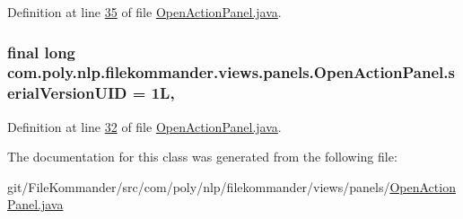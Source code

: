 Definition at line \hyperlink{L35}{35} of file \hyperlink{}{Open\-Action\-Panel.\-java}.

\hypertarget{classcom_1_1poly_1_1nlp_1_1filekommander_1_1views_1_1panels_1_1_open_action_panel_a2f0300dacedd726f9822a744a90284cd}{
\subsubsection[{serial\-Version\-U\-I\-D}]{\setlength{\rightskip}{0pt plus 5cm}final long com.\-poly.\-nlp.\-filekommander.\-views.\-panels.\-Open\-Action\-Panel.\-serial\-Version\-U\-I\-D = 1\-L\hspace{0.3cm}{\ttfamily [static]}, {\ttfamily [private]}}}\label{classcom_1_1poly_1_1nlp_1_1filekommander_1_1views_1_1panels_1_1_open_action_panel_a2f0300dacedd726f9822a744a90284cd}


Definition at line \hyperlink{L32}{32} of file \hyperlink{}{Open\-Action\-Panel.\-java}.



The documentation for this class was generated from the following file\-:\begin{DoxyCompactItemize}
\item 
git/\-File\-Kommander/src/com/poly/nlp/filekommander/views/panels/\hyperlink{_open_action_panel_8java}{Open\-Action\-Panel.\-java}\end{DoxyCompactItemize}
